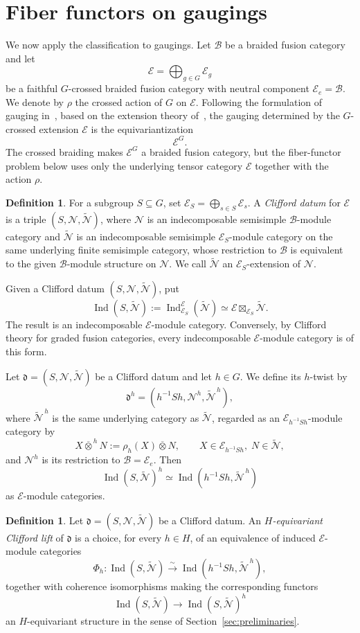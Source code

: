 \documentclass[12pt]{amsart}
\theoremstyle{plain}
\theoremstyle{definition} %
\newtheorem{definition}[theorem]{Definition}
\theoremstyle{remark} %
\newcommand{\cB}{\mathcal{B}}
\newcommand{\cE}{\mathcal{E}}
\newcommand{\cN}{\mathcal{N}}
\DeclareMathOperator{\Ind}{Ind}
\begin{document}
\section{Fiber functors on gaugings}\label{sec:gauging}

We now apply the classification to gaugings. Let $\cB$ be a braided fusion category and let
\[
\cE=\bigoplus_{g\in G}\cE_g
\]
be a faithful $G$-crossed braided fusion category with neutral component $\cE_e=\cB$. We denote by $\rho$ the crossed action of $G$ on $\cE$. Following the formulation of gauging in~\cite{CGPW16}, based on the extension theory of~\cite{ENO10}, the gauging determined by the $G$-crossed extension $\cE$ is the equivariantization
\[
\cE^G.
\]
The crossed braiding makes $\cE^G$ a braided fusion category, but the fiber-functor problem below uses only the underlying tensor category $\cE$ together with the action $\rho$.

\begin{definition}
For a subgroup $S\subseteq G$, set $\cE_S=\bigoplus_{s\in S}\cE_s$. A \emph{Clifford datum} for $\cE$ is a triple $(S,\cN,\widetilde{\cN})$, where $\cN$ is an indecomposable semisimple $\cB$-module category and $\widetilde{\cN}$ is an indecomposable semisimple $\cE_S$-module category on the same underlying finite semisimple category, whose restriction to $\cB$ is equivalent to the given $\cB$-module structure on $\cN$. We call $\widetilde{\cN}$ an $\cE_S$-extension of $\cN$.
\end{definition}

Given a Clifford datum $(S,\cN,\widetilde{\cN})$, put
\[
\Ind(S,\widetilde{\cN})
:=\Ind_{\cE_S}^{\cE}(\widetilde{\cN})
\simeq \cE\boxtimes_{\cE_S}\widetilde{\cN}.
\]
The result is an indecomposable $\cE$-module category. Conversely, by Clifford theory for graded fusion categories, every indecomposable $\cE$-module category is of this form.

Let $\mathfrak d=(S,\cN,\widetilde{\cN})$ be a Clifford datum and let $h\in G$. We define its $h$-twist by
\[
\mathfrak d^h=(h^{-1}Sh,\cN^h,\widetilde{\cN}^{\,h}),
\]
where $\widetilde{\cN}^{\,h}$ is the same underlying category as $\widetilde{\cN}$, regarded as an $\cE_{h^{-1}Sh}$-module category by
\[
X\overline{\otimes}^{\,h} N:=\rho_h(X)\overline{\otimes}N,
\qquad X\in \cE_{h^{-1}Sh},\; N\in\widetilde{\cN},
\]
and $\cN^h$ is its restriction to $\cB=\cE_e$. Then
\[
\Ind(S,\widetilde{\cN})^h\simeq
\Ind(h^{-1}Sh,\widetilde{\cN}^{\,h})
\]
as $\cE$-module categories.

\begin{definition}
Let $\mathfrak d=(S,\cN,\widetilde{\cN})$ be a Clifford datum. An \emph{$H$-equivariant Clifford lift} of $\mathfrak d$ is a choice, for every $h\in H$, of an equivalence of induced $\cE$-module categories
\[
\Phi_h:\Ind(S,\widetilde{\cN})\xrightarrow{\sim}
\Ind(h^{-1}Sh,\widetilde{\cN}^{\,h}),
\]
together with coherence isomorphisms making the corresponding functors
\[
\Ind(S,\widetilde{\cN})\longrightarrow
\Ind(S,\widetilde{\cN})^h
\]
an $H$-equivariant structure in the sense of Section~\ref{sec:preliminaries}.
\end{definition}
\end{document}
